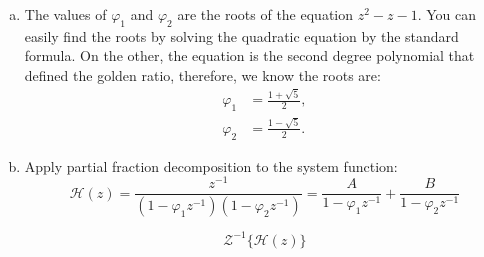 \begin{enumerate}
\begin{enumerate}[a)]
\item The values of $\varphi_{1}$ and $\varphi_{2}$ are the roots of the equation $z^{2}-z-1$. You can easily find the roots by solving the quadratic equation by the standard formula. On the other, the equation is the second degree polynomial that defined the golden ratio, therefore, we know the roots are:
\begin{align*}
    \varphi_{1} &= \frac{1+\sqrt{5}}{2}, \\
    \varphi_{2} &= \frac{1-\sqrt{5}}{2}.
\end{align*}

\item Apply partial fraction decomposition to the system function:
$$\mathcal{H}(z)=\frac{z^{-1}}{(1-\varphi_{1}z^{-1})(1-\varphi_{2}z^{-1})}=\frac{A}{1-\varphi_{1}z^{-1}}+\frac{B}{1-\varphi_{2}z^{-1}}$$


$$\mathcal{Z}^{-1}\{\mathcal{H}(z)\}$$


\end{enumerate}
\end{enumerate}